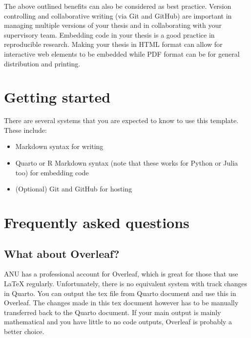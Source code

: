\documentclass[
  11pt,
  a4paper,
  twoside]{scrbook}
\providecommand{\tightlist}{%
  \setlength{\itemsep}{0pt}\setlength{\parskip}{0pt}}
\begin{document}
The above outlined benefits can also be considered as best practice.
Version controlling and collaborative writing (via Git and GitHub) are
important in managing multiple versions of your thesis and in
collaborating with your supervisory team. Embedding code in your thesis
is a good practice in reproducible research. Making your thesis in HTML
format can allow for interactive web elements to be embedded while PDF
format can be for general distribution and printing.

\section*{Getting started}\label{getting-started}


There are several systems that you are expected to know to use this
template. These include:

\begin{itemize}
\tightlist
\item
  Markdown syntax for writing
\item
  Quarto or R Markdown syntax (note that these works for Python or Julia
  too) for embedding code
\item
  (Optional) Git and GitHub for hosting
\end{itemize}

\section*{Frequently asked questions}\label{frequently-asked-questions}


\subsection*{What about Overleaf?}\label{what-about-overleaf}

ANU has a professional account for Overleaf, which is great for those
that use LaTeX regularly. Unfortunately, there is no equivalent system
with track changes in Quarto. You can output the tex file from Quarto
document and use this in Overleaf. The changes made in this tex document
however has to be manually transferred back to the Quarto document. If
your main output is mainly mathematical and you have little to no code
outputs, Overleaf is probably a better choice.
\end{document}
